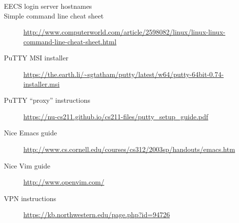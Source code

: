 \documentclass{tufte-handout}
\def\PuTTYurl{https://the.earth.li/~sgtatham/putty/latest/w64/putty-64bit-0.74-installer.msi}
\def\GlobalProtectUrl{https://kb.northwestern.edu/page.php?id=94726}
\def\PuTTYhelpUrl{https://nu-cs211.github.io/cs211-files/putty_setup_guide.pdf}
\begin{document}
\begin{description}

\item[EECS login server hostnames]
\LabHostnamesLink

\item[Simple command line cheat sheet]
\url{http://www.computerworld.com/article/2598082/linux/linux-linux-command-line-cheat-sheet.html}

\item[PuTTY MSI installer]
\url{\PuTTYurl}

\item[PuTTY ``proxy'' instructions]
\url{\PuTTYhelpUrl}

\item[Nice Emacs guide]
\url{http://www.cs.cornell.edu/courses/cs312/2003sp/handouts/emacs.htm}

\item[Nice Vim guide]
\url{http://www.openvim.com/}

\item[VPN instructions]
\url{\GlobalProtectUrl}

\end{description}
\end{document}
